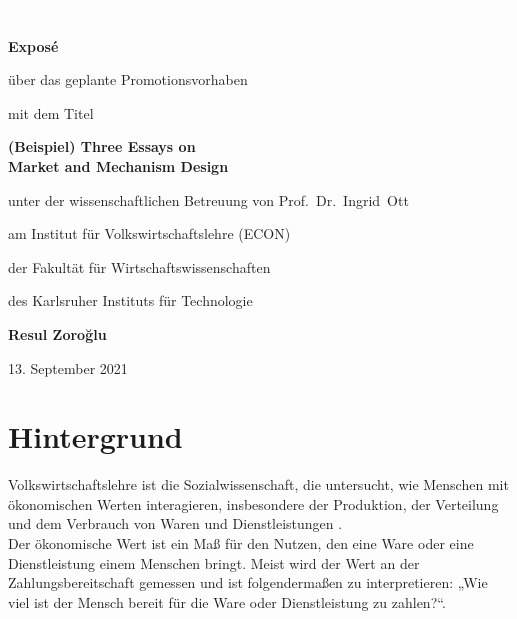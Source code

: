 \documentclass[a4paper,bibliography=totocnumbered,12pt]{article}
\begin{document}
\begin{titlepage}
	\centering
	{\textcolor{white}{nichts}\par}
	\vspace{2cm}
	{\bfseries Exposé \par}
	\vspace{0.1cm}
	{über das geplante Promotionsvorhaben \par}
	\vspace{0.1cm}
	{mit dem Titel \par}
	\vspace{3cm}
{\bfseries\Large (Beispiel) Three Essays on \\ Market and Mechanism Design \par}
	\vspace{3cm}
	{unter der wissenschaftlichen Betreuung von Prof.\ Dr.\ Ingrid\ Ott\par}
	\vspace{0.1cm}
	{am Institut für Volkswirtschaftslehre (ECON)\par}
	\vspace{0.1cm}
	{der Fakultät für Wirtschaftswissenschaften \par}
	\vspace{0.1cm}
	{des Karlsruher Instituts für Technologie\par}
	\vspace{3cm}
	{\bfseries\Large Resul Zoro\u{g}lu \par}
	\vspace{0.1cm}

	\vfill

	{13. September 2021}
\end{titlepage}
\thispagestyle{empty}


\clearpage
\thispagestyle{empty}
\clearpage

\pagestyle{scrheadings}
\clearscrheadfoot
\ohead{\headmark}
\ifoot{}
\cfoot{}
\ofoot{\pagemark}
\tableofcontents
\clearpage
\thispagestyle{empty}
\clearpage
{}

\section{Hintergrund}
Volkswirtschaftslehre ist die Sozialwissenschaft, die untersucht, wie Menschen mit ökonomischen Werten interagieren, insbesondere der Produktion, der Verteilung und dem Verbrauch von Waren und Dienstleistungen \cite{krugmanEconomics2013}. \\
Der ökonomische Wert ist ein Maß für den Nutzen, den eine Ware oder eine Dienstleistung einem Menschen bringt. Meist wird der Wert an der Zahlungsbereitschaft gemessen und ist folgendermaßen zu interpretieren: „Wie viel ist der Mensch bereit für die Ware oder Dienstleistung zu zahlen?“.
\end{document}
